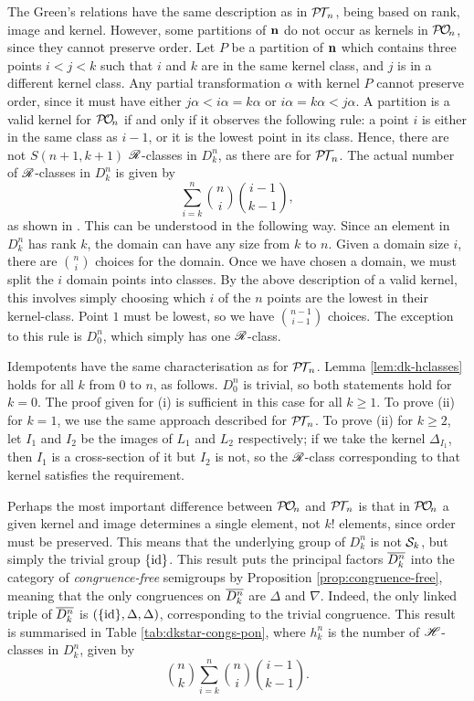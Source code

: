 The Green's relations have the same description as in $\mathcal{P\!T\!}_n$, being based on
rank, image and kernel.  However, some partitions of $\mathbf{n}$ do not occur as
kernels in $\mathcal{P\!O\!}_n$, since they cannot preserve order.  Let $P$ be a partition of
$\mathbf{n}$ which contains three points $i < j < k$ such that $i$ and $k$ are in the
same kernel class, and $j$ is in a different kernel class.  Any partial
transformation $\alpha$ with kernel $P$ cannot preserve order, since it must
have either $j\alpha < i\alpha = k\alpha$ or $i\alpha = k\alpha < j\alpha$.  A
partition is a valid kernel for $\mathcal{P\!O\!}_n$ if and only if it observes the following
rule: a point $i$ is either in the same class as $i-1$, or it is the lowest
point in its class.  Hence, there are not $S(n+1, k+1)$ $\mathrel{\mathscr{R}}$-classes in
$D_k^n$, as there are for $\mathcal{P\!T\!}_n$.  The actual number of $\mathrel{\mathscr{R}}$-classes in
$D_k^n$ is given by
$$\sum_{i=k}^n \binom{n}{i} \binom{i-1}{k-1},$$
as shown in \cite[Lemma 4.1]{pon}.  This can be understood in the following way.
Since an element in $D_k^n$ has rank $k$, the domain can have any size from $k$
to $n$.  Given a domain size $i$, there are $\binom{n}{i}$ choices for the
domain.  Once we have chosen a domain, we must split the $i$ domain points into
classes.  By the above description of a valid kernel, this involves simply
choosing which $i$ of the $n$ points are the lowest in their kernel-class.
Point $1$ must be lowest, so we have $\binom{n-1}{i-1}$ choices.  The exception
to this rule is $D_0^n$, which simply has one $\mathrel{\mathscr{R}}$-class.

Idempotents have the same characterisation as for $\mathcal{P\!T\!}_n$.  Lemma
\ref{lem:dk-hclasses} holds for all $k$ from $0$ to $n$, as follows.  $D_0^n$ is
trivial, so both statements hold for $k=0$.  The proof given for (i) is
sufficient in this case for all $k \geq 1$.  To prove (ii) for $k=1$, we use the
same approach described for $\mathcal{P\!T\!}_n$.  To prove (ii) for $k \geq 2$, let $I_1$ and
$I_2$ be the images of $L_1$ and $L_2$ respectively; if we take the kernel
$\Delta_{I_1}$, then $I_1$ is a cross-section of it but $I_2$ is not, so the
$\mathrel{\mathscr{R}}$-class corresponding to that kernel satisfies the requirement.

Perhaps the most important difference between $\mathcal{P\!O\!}_n$ and $\mathcal{P\!T\!}_n$ is that in
$\mathcal{P\!O\!}_n$ a given kernel and image determines a single element, not $k!$ elements,
since order must be preserved.  This means that the underlying group of $D_k^n$
is not $\mathcal{S}_k$, but simply the trivial group $\{\operatorname{id}\}$.  This result puts the
principal factors $\overline{D_k^n}$ into the category of \textit{congruence-free}
semigroups by Proposition \ref{prop:congruence-free}, meaning that the only
congruences on $\overline{D_k^n}$ are $\Delta$ and $\nabla$.  Indeed, the only linked
triple of $\overline{D_k^n}$ is $(\{\operatorname{id}\}, \Delta, \Delta)$, corresponding to the trivial
congruence.  This result is summarised in Table \ref{tab:dkstar-congs-pon},
where $h_k^n$ is the number of $\mathrel{\mathscr{H}}$-classes in $D_k^n$, given by
$$\binom{n}{k} \sum_{i=k}^n \binom{n}{i} \binom{i-1}{k-1}.$$

